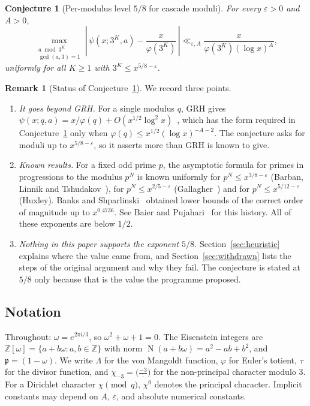 \documentclass[12pt]{amsart}
\theoremstyle{plain}
\newtheorem{conjecture}[theorem]{Conjecture}
\theoremstyle{definition}
\newtheorem{remark}[theorem]{Remark}
\newcommand{\Z}{\mathbb{Z}}
\newcommand{\Zomega}{\Z[\omega]}
\newcommand{\pp}{\mathfrak{p}}
\DeclareMathOperator{\N}{N}
\begin{document}
\begin{conjecture}[Per-modulus level $5/8$ for cascade moduli]
\label{conj:main}
For every $\varepsilon > 0$ and $A > 0$,
\[
  \max_{\substack{a \bmod 3^K \\ \gcd(a,3)=1}}
  \left|\,\psi(x;3^K,a) - \frac{x}{\varphi(3^K)}\,\right|
  \ll_{\varepsilon,A} \frac{x}{\varphi(3^K)(\log x)^A},
\]
uniformly for all $K \geq 1$ with $3^K \leq x^{5/8-\varepsilon}$.
\end{conjecture}

\begin{remark}[Status of Conjecture~\ref{conj:main}]
\label{rem:status}
We record three points.
\begin{enumerate}[label=(\alph*)]
  \item \emph{It goes beyond GRH.} For a single modulus $q$, GRH gives
    $\psi(x;q,a) = x/\varphi(q) + O(x^{1/2}\log^2 x)$~\cite[Ch.~20]{Davenport2000},
    which has the form required in Conjecture~\ref{conj:main} only when
    $\varphi(q) \leq x^{1/2}(\log x)^{-A-2}$. The conjecture asks for moduli
    up to $x^{5/8-\varepsilon}$, so it asserts more than GRH is known to give.
  \item \emph{Known results.} For a fixed odd prime $p$, the asymptotic
    formula for primes in progressions to the modulus $p^N$ is known
    uniformly for $p^N \leq x^{3/8-\varepsilon}$ (Barban, Linnik and
    Tshudakov~\cite{BLT1964}), for $p^N \leq x^{2/5-\varepsilon}$
    (Gallagher~\cite{Gallagher1972}) and for $p^N \leq x^{5/12-\varepsilon}$
    (Huxley). Banks and Shparlinski~\cite{BanksShparlinski2019} obtained
    lower bounds of the correct order of magnitude up to $x^{0.4736}$. See
    Baier and Pujahari~\cite{BaierPujahari2022} for this history. All of these
    exponents are below $1/2$.
  \item \emph{Nothing in this paper supports the exponent $5/8$.}
    Section~\ref{sec:heuristic} explains where the value came from, and
    Section~\ref{sec:withdrawn} lists the steps of the original argument and
    why they fail. The conjecture is stated at $5/8$ only because that is the
    value the programme proposed.
\end{enumerate}
\end{remark}

\subsection{Notation}

Throughout: $\omega = e^{2\pi i/3}$, so $\omega^2 + \omega + 1 = 0$. The
Eisenstein integers are $\Zomega = \{a + b\omega : a,b \in \Z\}$ with norm
$\N(a+b\omega) = a^2 - ab + b^2$, and $\pp = (1-\omega)$. We write $\Lambda$
for the von Mangoldt function, $\varphi$ for Euler's totient, $\tau$ for the
divisor function, and $\chi_{-3} = \bigl(\tfrac{-3}{\cdot}\bigr)$ for the
non-principal character modulo $3$. For a Dirichlet character
$\chi \pmod{q}$, $\chi^0$ denotes the principal character. Implicit
constants may depend on $A$, $\varepsilon$, and absolute numerical
constants.
\end{document}
